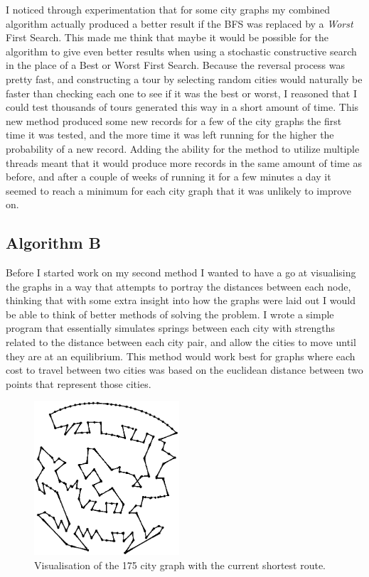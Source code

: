 \documentclass[a4paper,11pt]{article}
\begin{document}
I noticed through experimentation that for some city graphs my combined 
algorithm actually produced a better result if the BFS was replaced by a 
\emph{Worst} First Search. This made me think that maybe it would be possible
for the algorithm to give even better results when using a stochastic
constructive search in the place of a Best or Worst First Search. Because the
reversal process was pretty fast, and constructing a tour by selecting random
cities would naturally be faster than checking each one to see if it was the
best or worst, I reasoned that I could test thousands of tours generated this
way in a short amount of time. This new method produced some new records for
a few of the city graphs the first time it was tested, and the more time it was
left running for the higher the probability of a new record. Adding the ability
for the method to utilize multiple threads meant that it would produce more
records in the same amount of time as before, and after a couple of weeks of
running it for a few minutes a day it seemed to reach a minimum for each city
graph that it was unlikely to improve on.

\subsection{Algorithm B}

Before I started work on my second method I wanted to have a go at visualising
the graphs in a way that attempts to portray the distances between each node,
thinking that with some extra insight into how the graphs were laid out I would
be able to think of better methods of solving the problem. I wrote a simple
program that essentially simulates springs between each city with strengths
related to the distance between each city pair, and allow the cities to move
until they are at an equilibrium. This method would work best for graphs where
each cost to travel between two cities was based on the euclidean distance
between two points that represent those cities.

\begin{figure}
\includegraphics[width=0.48\textwidth]{175vis}
\caption{Visualisation of the 175 city graph with the current shortest route.}
\end{figure}
\end{document}
